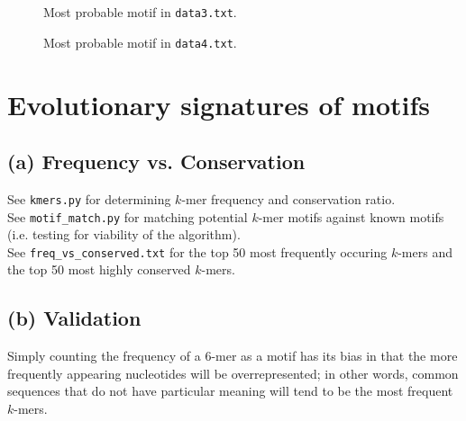\documentclass[11pt]{article}
\begin{document}
\begin{figure}
\noindent{}
\caption{Most probable motif in {\tt data3.txt}.}
\end{figure}

\begin{figure}
\noindent{}
\caption{Most probable motif in {\tt data4.txt}.}
\end{figure}

\section{Evolutionary signatures of motifs}
\subsection*{(a) Frequency vs. Conservation}
See {\tt kmers.py} for determining $k$-mer frequency and
conservation ratio.\\
See {\tt motif\_match.py} for matching potential $k$-mer
motifs against known motifs (i.e. testing for viability
of the algorithm).\\
See {\tt freq\_vs\_conserved.txt} for the top 50 most
frequently occuring $k$-mers and the top 50 most
highly conserved $k$-mers.

\subsection*{(b) Validation}
Simply counting the frequency of a $6$-mer as a motif has its
bias in that the more frequently appearing nucleotides will
be overrepresented; in other words, common sequences that
do not have particular meaning will tend to be the most
frequent $k$-mers.
\end{document}
